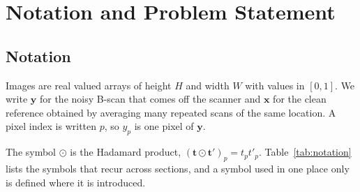 \section{Notation and Problem Statement}
\label{sec:problem}

\subsection{Notation}
\label{sec:notation}
Images are real valued arrays of height $H$ and width $W$ with values in $[0,1]$. We write $\mathbf{y}$
for the noisy B-scan that comes off the scanner and $\mathbf{x}$ for the clean reference obtained by
averaging many repeated scans of the same location. A pixel index is written $p$, so $y_p$ is one
pixel of $\mathbf{y}$.

The symbol $\odot$ is the Hadamard product, $(\mathbf{t} \odot \mathbf{t}')_p = t_p t'_p$.
Table~\ref{tab:notation} lists the symbols that recur across sections, and a symbol used in one place
only is defined where it is introduced.

